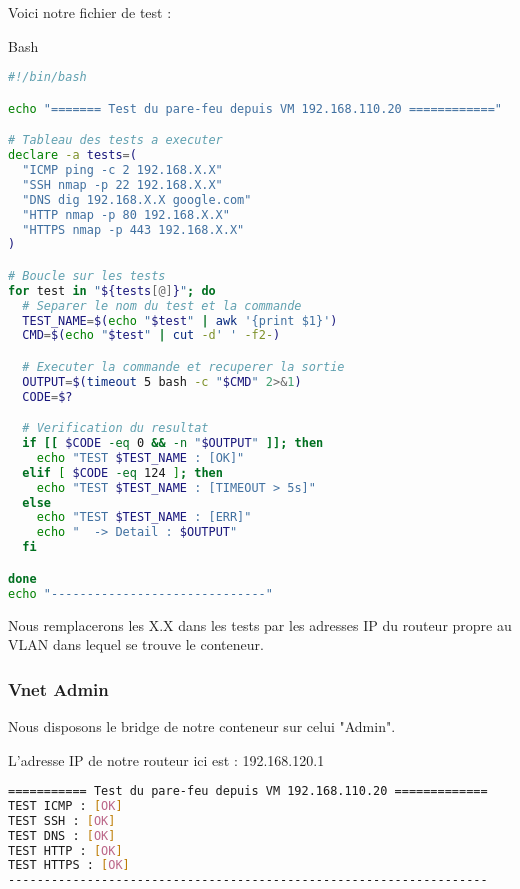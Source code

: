 \documentclass{article}
\begin{document}
Voici notre fichier de test :

\begin{codebox}{Bash}
\begin{lstlisting}[language=Bash]
#!/bin/bash

echo "======= Test du pare-feu depuis VM 192.168.110.20 ============"

# Tableau des tests a executer
declare -a tests=(
  "ICMP ping -c 2 192.168.X.X"
  "SSH nmap -p 22 192.168.X.X"
  "DNS dig 192.168.X.X google.com"
  "HTTP nmap -p 80 192.168.X.X"
  "HTTPS nmap -p 443 192.168.X.X"
)

# Boucle sur les tests
for test in "${tests[@]}"; do
  # Separer le nom du test et la commande
  TEST_NAME=$(echo "$test" | awk '{print $1}')
  CMD=$(echo "$test" | cut -d' ' -f2-)

  # Executer la commande et recuperer la sortie
  OUTPUT=$(timeout 5 bash -c "$CMD" 2>&1)
  CODE=$?

  # Verification du resultat
  if [[ $CODE -eq 0 && -n "$OUTPUT" ]]; then
    echo "TEST $TEST_NAME : [OK]"
  elif [ $CODE -eq 124 ]; then
    echo "TEST $TEST_NAME : [TIMEOUT > 5s]"
  else
    echo "TEST $TEST_NAME : [ERR]"
    echo "  -> Detail : $OUTPUT"
  fi

done
echo "------------------------------"
\end{lstlisting}
\end{codebox}

Nous remplacerons les X.X dans les tests par les adresses IP du routeur propre au VLAN dans lequel se trouve le conteneur.

\subsubsection{Vnet Admin}

Nous disposons le bridge de notre conteneur sur celui "Admin".

L'adresse IP de notre routeur ici est : 192.168.120.1

\begin{commandout}
\begin{lstlisting}[language=Bash]
=========== Test du pare-feu depuis VM 192.168.110.20 =============
TEST ICMP : [OK]
TEST SSH : [OK]
TEST DNS : [OK]
TEST HTTP : [OK]
TEST HTTPS : [OK]
-------------------------------------------------------------------
\end{lstlisting}
\end{commandout}
\end{document}
